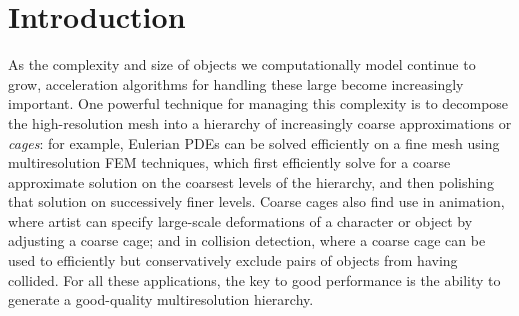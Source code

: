 \section{Introduction}
\label{sec:introduction}

As the complexity and size of objects we computationally model continue to
grow, acceleration algorithms for handling these large become
increasingly important. One powerful technique for managing this complexity is to decompose the
high-resolution mesh into a hierarchy of increasingly coarse approximations or
\emph{cages}: for example, Eulerian PDEs can be solved efficiently on a fine
mesh using multiresolution FEM techniques, which
first efficiently solve for a coarse approximate solution on the coarsest levels of the
hierarchy, and then polishing that solution on successively finer levels.
Coarse cages also find use in animation, where artist can specify large-scale deformations of
a character or object by adjusting a coarse cage; and in collision detection, where
a coarse cage can be used to efficiently but conservatively exclude pairs of
objects from having collided. For all these applications, the key to good
performance is the ability to generate a good-quality multiresolution
hierarchy.


